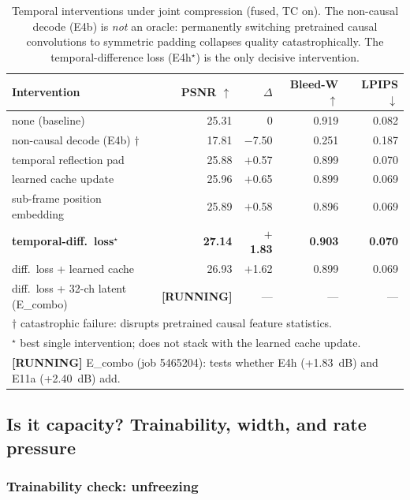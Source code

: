 \begin{table}[t]
\centering
\caption{Temporal interventions under joint compression (fused, TC on). The non-causal decode (E4b) is \emph{not} an oracle: permanently switching pretrained causal convolutions to symmetric padding collapses quality catastrophically. The temporal-difference loss (E4h$^\star$) is the only decisive intervention.}
\label{tab:interventions}
\begin{tabular}{lrrrr}
\toprule
Intervention & PSNR $\uparrow$ & $\Delta$ & Bleed-W $\uparrow$ & LPIPS $\downarrow$ \\
\midrule
none (baseline)                             & 25.31 & 0       & 0.919 & 0.082 \\
non-causal decode (E4b) $\dagger$           & 17.81 & $-$7.50 & 0.251 & 0.187 \\
\midrule
temporal reflection pad                     & 25.88 & $+$0.57 & 0.899 & 0.070 \\
learned cache update                        & 25.96 & $+$0.65 & 0.899 & 0.069 \\
sub-frame position embedding                & 25.89 & $+$0.58 & 0.896 & 0.069 \\
\textbf{temporal-diff.\ loss$^\star$}       & \textbf{27.14} & $\mathbf{+}$\textbf{1.83} & \textbf{0.903} & \textbf{0.070} \\
diff.\ loss + learned cache                 & 26.93 & $+$1.62 & 0.899 & 0.069 \\
\midrule
diff.\ loss + 32-ch latent (E\_combo)       & \textbf{[RUNNING]} & --- & --- & --- \\
\bottomrule
\multicolumn{5}{l}{\small $\dagger$ catastrophic failure: disrupts pretrained causal feature statistics.}\\
\multicolumn{5}{l}{\small $^\star$ best single intervention; does not stack with the learned cache update.}\\
\multicolumn{5}{l}{\small \textbf{[RUNNING]} E\_combo (job 5465204): tests whether E4h (+1.83~dB) and E11a (+2.40~dB) add.}\\
\end{tabular}
\end{table}

\subsection{Is it capacity? Trainability, width, and rate pressure}

\subsubsection{Trainability check: unfreezing}


